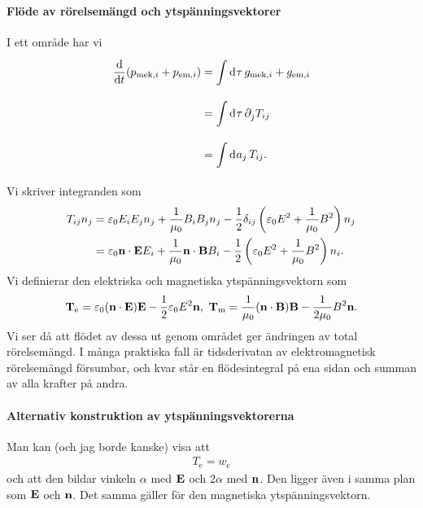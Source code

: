 \paragraph{Flöde av rörelsemängd och ytspänningsvektorer}
I ett område har vi
\begin{align*}
	\dv{t}(p_{\text{mek}, i} + p_{\text{em}, i}) &= \int\limits_{}^{}\dd[]{\tau}g_{\text{mek}, i} + g_{\text{em}, i} \\
	                                             &= \int\limits_{}^{}\dd[]{\tau}\partial_{j}^{}T_{ij} \\
	                                             &= \int\limits_{}^{}\dd[]{a_{j}}T_{ij}.
\end{align*}
Vi skriver integranden som
\begin{align*}
	T_{ij}n_{j} &= \varepsilon_{0}E_{i}E_{j}n_{j} + \frac{1}{\mu_{0}}B_{i}B_{j}n_{j} - \frac{1}{2}\delta_{ij}\left(\varepsilon_{0}E^{2} + \frac{1}{\mu_{0}}B^{2}\right)n_{j} \\
	            &= \varepsilon_{0}\vb{n}\cdot\vb{E}E_{i} + \frac{1}{\mu_{0}}\vb{n}\cdot\vb{B}B_{i} - \frac{1}{2}\left(\varepsilon_{0}E^{2} + \frac{1}{\mu_{0}}B^{2}\right)n_{i}.
\end{align*}
Vi definierar den elektriska och magnetiska ytspänningsvektorn som
\begin{align*}
	\vb{T}_{\text{e}} = \varepsilon_{0}(\vb{n}\cdot\vb{E})\vb{E} - \frac{1}{2}\varepsilon_{0}E^{2}\vb{n},\ \vb{T}_{\text{m}} = \frac{1}{\mu_{0}}(\vb{n}\cdot\vb{B})\vb{B} - \frac{1}{2\mu_{0}}B^{2}\vb{n}.
\end{align*}
Vi ser då att flödet av dessa ut genom området ger ändringen av total rörelsemängd. I många praktiska fall är tidsderivatan av elektromagnetisk rörelsemängd försumbar, och kvar står en flödesintegral på ena sidan och summan av alla krafter på andra.

\paragraph{Alternativ konstruktion av ytspänningsvektorerna}
Man kan (och jag borde kanske) visa att
\begin{align*}
	T_{\text{e}} = w_{\text{e}}
\end{align*}
och att den bildar vinkeln $\alpha$ med $\vb{E}$ och $2\alpha$ med $\vb{n}$. Den ligger även i samma plan som $\vb{E}$ och $\vb{n}$. Det samma gäller för den magnetiska ytspänningsvektorn.

